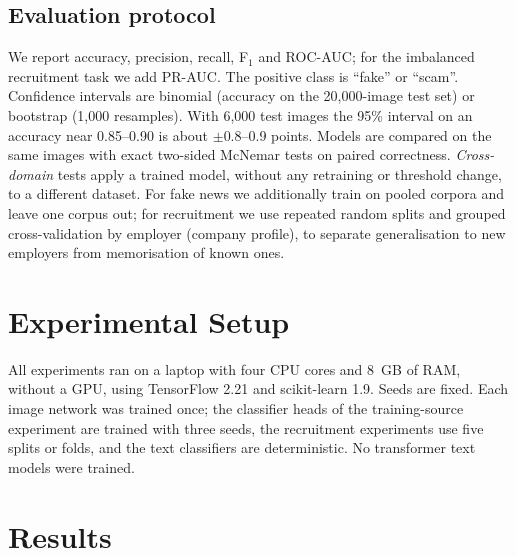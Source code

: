 \documentclass[11pt,a4paper]{article}
\begin{document}
\subsection{Evaluation protocol}
We report accuracy, precision, recall, F$_1$ and ROC-AUC; for the imbalanced recruitment task we add PR-AUC. The positive class is ``fake'' or ``scam''. Confidence intervals are binomial (accuracy on the 20{,}000-image test set) or bootstrap (1{,}000 resamples). With 6{,}000 test images the 95\% interval on an accuracy near 0.85--0.90 is about $\pm0.8$--0.9 points. Models are compared on the same images with exact two-sided McNemar tests on paired correctness. \emph{Cross-domain} tests apply a trained model, without any retraining or threshold change, to a different dataset. For fake news we additionally train on pooled corpora and leave one corpus out; for recruitment we use repeated random splits and grouped cross-validation by employer (company profile), to separate generalisation to new employers from memorisation of known ones.

\section{Experimental Setup}
All experiments ran on a laptop with four CPU cores and 8~GB of RAM, without a GPU, using TensorFlow 2.21 and scikit-learn 1.9. Seeds are fixed. Each image network was trained once; the classifier heads of the training-source experiment are trained with three seeds, the recruitment experiments use five splits or folds, and the text classifiers are deterministic. No transformer text models were trained.

\section{Results}
\end{document}
